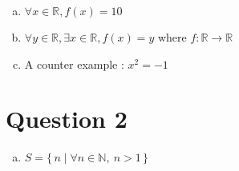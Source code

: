 \documentclass[12pt]{article}
\begin{document}
\begin{enumerate}[a)]
    \item
        $\forall x \in \mathbb{R}, f(x) = 10$

    \item
        $\forall y \in \mathbb{R}, \exists x \in \mathbb{R}, f(x) = y$ where $f: \mathbb{R} \to \mathbb{R}$

    \item
        A counter example : $x^2 = -1$

\end{enumerate}

\section*{Question 2}

\begin{enumerate}[a)]
    \item
        $S = \{\,n \mid \forall n \in \mathbb{N},\:n > 1\,\}$

\end{enumerate}
\end{document}
